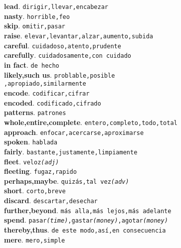 \documentclass[twocolumn]{article}
\begin{document}
	\textsf{\textbf{lead}}. \texttt{dirigir,llevar,encabezar}\\
	\textsf{\textbf{nasty}}. \texttt{horrible,feo}\\
	\textsf{\textbf{skip}}. \texttt{omitir,pasar}\\
	\textsf{\textbf{raise}}. \texttt{elevar,levantar,alzar,aumento,subida}\\
	\textsf{\textbf{careful}}. \texttt{cuidadoso,atento,prudente}\\
	\textsf{\textbf{carefully}}. \texttt{cuidadosamente,con cuidado}\\
	\textsf{\textbf{in fact}}. \texttt{de hecho}\\
	\textsf{\textbf{likely,such us}}. \texttt{problable,posible\\,apropiado,similarmente}\\
	\textsf{\textbf{encode}}. \texttt{codificar,cifrar}\\
	\textsf{\textbf{encoded}}. \texttt{codificado,cifrado}\\
	\textsf{\textbf{patterns}}. \texttt{patrones}\\
	\textsf{\textbf{whole,entire,complete}}. \texttt{entero,completo,todo,total}\\
	\textsf{\textbf{approach}}. \texttt{enfocar,acercarse,aproximarse}\\
	\textsf{\textbf{spoken}}. \texttt{hablada}\\
	\textsf{\textbf{fairly}}. \texttt{bastante,justamente,limpiamente}\\
	\textsf{\textbf{fleet}}. \texttt{veloz{\scriptsize \textit{(adj)}}}\\
	\textsf{\textbf{fleeting}}. \texttt{fugaz,rapido}\\
	\textsf{\textbf{perhaps,maybe}}. \texttt{quiz\'as,tal vez{\scriptsize \textit{(adv)}}}\\
	\textsf{\textbf{short}}. \texttt{corto,breve}\\
	\textsf{\textbf{discard}}. \texttt{descartar,desechar}\\
	\textsf{\textbf{further,beyond}}. \texttt{m\'as alla,m\'as lejos,m\'as adelante}\\
	\textsf{\textbf{spend}}. \texttt{pasar{\scriptsize \textit{(time)}},gastar{\scriptsize \textit{(money)}},agotar{\scriptsize \textit{(money)}}}\\
	\textsf{\textbf{thereby,thus}}. \texttt{de este modo,as\'i,en consecuencia}\\
	\textsf{\textbf{mere}}. \texttt{mero,simple}\\
\end{document}
